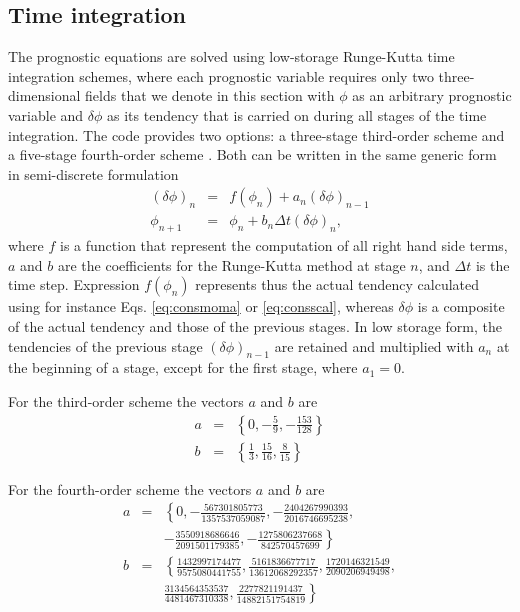 \documentclass[gmd]{copernicus}
\begin{document}
\subsection{Time integration}
The prognostic equations are solved using low-storage Runge-Kutta time integration schemes, where each prognostic variable requires only two three-dimensional fields that we denote in this section with $\phi$ as an arbitrary prognostic variable and $\delta \phi$ as its tendency that is carried on during all stages of the time integration. The code provides two options: a three-stage third-order scheme \citep{Williamson1980} and a five-stage fourth-order scheme \citep{Carpenter1994}. Both can be written in the same generic form in semi-discrete formulation
\begin{eqnarray}
\left( \delta \phi \right)_n & = & f \left( \phi_n \right) + a_n \left( \delta \phi \right)_{n-1} \\
\phi_{n+1} & = & \phi_n + b_n \Delta t \left( \delta \phi \right)_{n},
\end{eqnarray}
where $f$ is a function that represent the computation of all right hand side terms, $a$ and $b$ are the coefficients for the Runge-Kutta method at stage $n$, and $\Delta t$ is the time step. Expression $f \left( \phi_n \right)$ represents thus the actual tendency calculated using for instance Eqs. \ref{eq:consmoma} or \ref{eq:consscal}, whereas $\delta \phi$ is a composite of the actual tendency and those of the previous stages. In low storage form, the tendencies of the previous stage $\left( \delta \phi \right)_{n-1}$ are retained and multiplied with $a_n$ at the beginning of a stage, except for the first stage, where $a_1 = 0$. 

For the third-order scheme the vectors $a$ and $b$ are
\begin{eqnarray}
a & = & \left\{0, -\frac{5}{9}, -\frac{153}{128} \right\}\\
b & = & \left\{\frac{1}{3}, \frac{15}{16}, \frac{8}{15} \right\}
\end{eqnarray}

For the fourth-order scheme the vectors $a$ and $b$ are
\begin{eqnarray}
\nonumber a & = & \left\{0, -\frac{567301805773}{1357537059087},
-\frac{2404267990393}{2016746695238},\right.\\
& & \left. -\frac{3550918686646}{2091501179385},
-\frac{1275806237668}{842570457699} \right\}\\
\nonumber b & = & \left\{\frac{1432997174477}{9575080441755}, \frac{5161836677717}{13612068292357},
\frac{1720146321549}{2090206949498},\right.\\
& & \left. \frac{3134564353537}{4481467310338},
\frac{2277821191437}{14882151754819} \right\}
\end{eqnarray}
\end{document}
